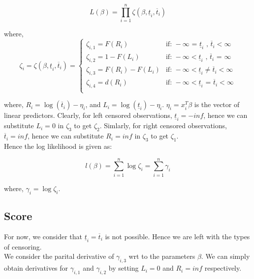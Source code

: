 \documentclass[12pt,a4paper]{report}
\begin{document}
\begin{equation}
L(\beta) = \prod_{i=1}^n \zeta(\beta, \underline t_i, \overline t_i)
\end{equation}

where,
\begin{equation} \label{zeta}
\zeta_i = \zeta(\beta, \underline t_i, \overline t_i) = \begin{cases}
													   \zeta_{i,1} = F(R_i) & \mbox{if: } -\infty \textbf{ = } \underline t_i \mbox{ , } \overline t_i<\infty \\
													   \zeta_{i,2} = 1- F(L_i) & \mbox{if: } -\infty < \underline t_i \mbox{ , }\overline t_i\textbf{ = }\infty \\
													   \zeta_{i,3} = F(R_i) - F(L_i) & \mbox{if: } -\infty < \underline t_i \ne \overline t_i<\infty \\
													   \zeta_{i,4} = d(R_i) & \mbox{if: } -\infty < \underline t_i \textbf{ = } \overline t_i<\infty \\
		\end{cases}
\end{equation}

where, $R_i = \log (\overline t_i) - \eta_i$, and $L_i = \log (\underline t_i) - \eta_i$. $\eta_i = x_i^T \beta$ is the vector of linear predictors.
Clearly, for left censored observations, $\underline t_i = -inf$, hence we can substitute $L_i = 0$ in $\zeta_3$ to get $\zeta_2$. 
Simlarly, for right censored observations, $\overline t_i = inf$, hence we can substitute $R_i = inf$ in $\zeta_3$ to get $\zeta_1$. \\

\vspace{8mm}
Hence the log likelihood is given as:

\begin{equation} \label{lik0}
l(\beta) = \sum_{i=1}^n \log \zeta_i = \sum_{i=1}^n \gamma_i %
\end{equation}

where, $\gamma_i = \log \zeta_i$.

\subsection{Score}
For now, we consider that $\underline t_i = \overline t_i$ is not possible. Hence we are left with the types of censoring. \\
We consider the parital derivative  of $\gamma_{i,3}$ wrt to the parameters $\beta$. We can simply obtain derivatives for
$\gamma_{i,1}$ and $\gamma_{i,2}$ by setting $L_i = 0$ and $R_i = inf$ respectively.\\
\end{document}
